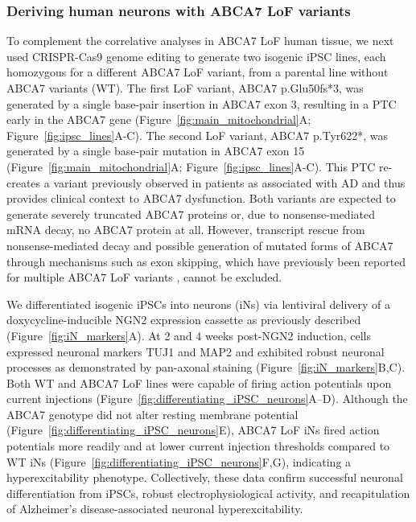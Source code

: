 \subsubsection{Deriving human neurons with ABCA7 LoF variants}
To complement the correlative analyses in ABCA7 LoF human tissue, we next used CRISPR-Cas9 genome editing to generate two isogenic iPSC lines, each homozygous for a different ABCA7 LoF variant, from a parental line without ABCA7 variants (WT). The first LoF variant, ABCA7 p.Glu50fs*3, was generated by a single base-pair insertion in ABCA7 exon 3, resulting in a PTC early in the ABCA7 gene (Figure~\ref{fig:main_mitochondrial}A; Figure~\ref{fig:ipsc_lines}A-C). The second LoF variant, ABCA7 p.Tyr622*, was generated by a single base-pair mutation in ABCA7 exon 15 (Figure~\ref{fig:main_mitochondrial}A; Figure~\ref{fig:ipsc_lines}A-C). This PTC re-creates a variant previously observed in patients as associated with AD \cite{Steinberg2015-mu} and thus provides clinical context to ABCA7 dysfunction. Both variants are expected to generate severely truncated ABCA7 proteins or, due to nonsense-mediated mRNA decay, no ABCA7 protein at all. However, transcript rescue from nonsense-mediated decay and possible generation of mutated forms of ABCA7 through mechanisms such as exon skipping, which have previously been reported for multiple ABCA7 LoF variants \cite{De_Roeck2017-hv}, cannot be excluded.

We differentiated isogenic iPSCs into neurons (iNs) via lentiviral delivery of a doxycycline-inducible NGN2 expression cassette as previously described \cite{Ho2016-kz} (Figure~\ref{fig:iN_markers}A). At 2 and 4 weeks post-NGN2 induction, cells expressed neuronal markers TUJ1 and MAP2 and exhibited robust neuronal processes as demonstrated by pan-axonal staining (Figure~\ref{fig:iN_markers}B,C). Both WT and ABCA7 LoF lines were capable of firing action potentials upon current injections (Figure~\ref{fig:differentiating_iPSC_neurons}A–D). Although the ABCA7 genotype did not alter resting membrane potential (Figure~\ref{fig:differentiating_iPSC_neurons}E), ABCA7 LoF iNs fired action potentials more readily and at lower current injection thresholds compared to WT iNs (Figure~\ref{fig:differentiating_iPSC_neurons}F,G), indicating a hyperexcitability phenotype. Collectively, these data confirm successful neuronal differentiation from iPSCs, robust electrophysiological activity, and recapitulation of Alzheimer's disease-associated neuronal hyperexcitability.


